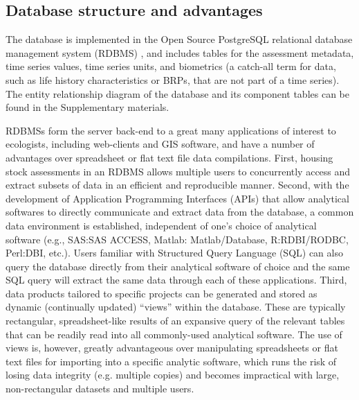 \documentclass[letterpaper,12pt]{article}
\begin{document}
\subsection*{Database structure and advantages}
The database is implemented in the Open Source PostgreSQL relational
database management system (RDBMS) \citep{postgresql:2009}, and includes tables for the assessment metadata,
time series values, time series units, and biometrics (a catch-all term
for data, such as life history characteristics or BRPs, that are not
part of a time series). The entity relationship diagram of the database and its component tables can be found in the Supplementary materials.

RDBMSs form the server back-end to a great many applications of
interest to ecologists, including web-clients and GIS software, and
have a number of advantages over spreadsheet or flat text file data
compilations.  First, housing stock assessments in an RDBMS allows
multiple users to concurrently access and extract subsets of data in
an efficient and reproducible manner. Second, with the development of
Application Programming Interfaces (APIs) that allow analytical
softwares to directly communicate and extract data from the database,
a common data environment is established, independent of one's choice
of analytical software (e.g., SAS:SAS ACCESS, Matlab: Matlab/Database,
R:RDBI/RODBC, Perl:DBI, etc.).  Users familiar with Structured Query
Language (SQL) can also query the database directly from their
analytical software of choice and the same SQL query will extract the
same data through each of these applications.  Third, data products
tailored to specific projects can be generated and stored as dynamic
(continually updated) ``views'' within the database.  These are
typically rectangular, spreadsheet-like results of an expansive query
of the relevant tables that can be readily read into all commonly-used
analytical software.  The use of views is, however, greatly
advantageous over manipulating spreadsheets or flat text files for
importing into a specific analytic software, which runs the risk of
losing data integrity (e.g. multiple copies) and becomes impractical
with large, non-rectangular datasets and multiple users.
\end{document}
